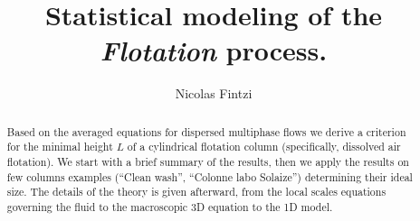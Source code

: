 \documentclass[12pt]{My_preprint}
\title{
    Statistical modeling of the \textit{Flotation} process.  
    }
\author[1,2]{Nicolas Fintzi}
\begin{document}
\maketitle


\begin{abstract}
    Based on the averaged equations for dispersed multiphase flows \citep{jackson2000} we derive a criterion for the minimal height $L$ of a cylindrical flotation column (specifically, dissolved air flotation). 
    We start with a brief summary of the results, then we apply the results on few columns examples (``Clean wash'', ``Colonne labo Solaize'') determining their ideal size. 
    The details of the theory is given afterward, from the local scales equations governing the fluid to the macroscopic 3D equation to the 1D model.
\end{abstract}
\tableofcontents
\newpage


% 




\appendix

\end{document}
